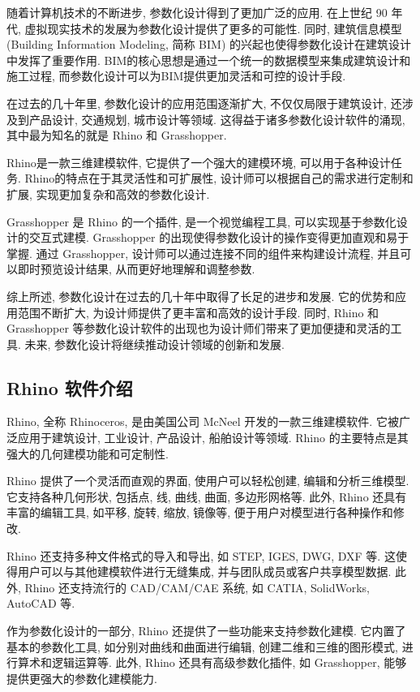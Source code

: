 随着计算机技术的不断进步, 参数化设计得到了更加广泛的应用.
在上世纪 90 年代, 虚拟现实技术的发展为参数化设计提供了更多的可能性.
同时, 建筑信息模型 (Building Information Modeling, 简称 BIM) 的兴起也使得参数化设计在建筑设计中发挥了重要作用.
BIM的核心思想是通过一个统一的数据模型来集成建筑设计和施工过程, 而参数化设计可以为BIM提供更加灵活和可控的设计手段.

在过去的几十年里, 参数化设计的应用范围逐渐扩大, 不仅仅局限于建筑设计, 还涉及到产品设计, 交通规划, 城市设计等领域.
这得益于诸多参数化设计软件的涌现, 其中最为知名的就是 Rhino 和 Grasshopper.

Rhino是一款三维建模软件, 它提供了一个强大的建模环境, 可以用于各种设计任务.
Rhino的特点在于其灵活性和可扩展性, 设计师可以根据自己的需求进行定制和扩展, 实现更加复杂和高效的参数化设计.

Grasshopper 是 Rhino 的一个插件, 是一个视觉编程工具, 可以实现基于参数化设计的交互式建模.
Grasshopper 的出现使得参数化设计的操作变得更加直观和易于掌握.
通过 Grasshopper, 设计师可以通过连接不同的组件来构建设计流程, 并且可以即时预览设计结果, 从而更好地理解和调整参数.

综上所述, 参数化设计在过去的几十年中取得了长足的进步和发展.
它的优势和应用范围不断扩大, 为设计师提供了更丰富和高效的设计手段.
同时, Rhino 和 Grasshopper 等参数化设计软件的出现也为设计师们带来了更加便捷和灵活的工具.
未来, 参数化设计将继续推动设计领域的创新和发展.

\subsection{Rhino 软件介绍}

Rhino, 全称 Rhinoceros, 是由美国公司 McNeel 开发的一款三维建模软件.
它被广泛应用于建筑设计, 工业设计, 产品设计, 船舶设计等领域.
Rhino 的主要特点是其强大的几何建模功能和可定制性.

Rhino 提供了一个灵活而直观的界面, 使用户可以轻松创建, 编辑和分析三维模型.
它支持各种几何形状, 包括点, 线, 曲线, 曲面, 多边形网格等.
此外, Rhino 还具有丰富的编辑工具, 如平移, 旋转, 缩放, 镜像等, 便于用户对模型进行各种操作和修改.

Rhino 还支持多种文件格式的导入和导出, 如 STEP, IGES, DWG, DXF 等.
这使得用户可以与其他建模软件进行无缝集成, 并与团队成员或客户共享模型数据.
此外, Rhino 还支持流行的 CAD/CAM/CAE 系统, 如 CATIA, SolidWorks, AutoCAD 等.

作为参数化设计的一部分, Rhino 还提供了一些功能来支持参数化建模.
它内置了基本的参数化工具, 如分别对曲线和曲面进行编辑, 创建二维和三维的图形模式, 进行算术和逻辑运算等.
此外, Rhino 还具有高级参数化插件, 如 Grasshopper, 能够提供更强大的参数化建模能力.

